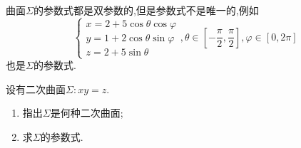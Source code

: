 \begin{remark}
    曲面$\Sigma$的参数式都是双参数的,但是参数式不是唯一的,例如
    $$
    \begin{cases}
        x = 2 + 5 \cos \theta \cos \varphi\\
        y = 1 + 2 \cos \theta \sin \varphi\\
        z = 2 + 5 \sin \theta
    \end{cases}, \theta \in [-\frac{\pi}{2},\frac{\pi}{2}],\varphi \in [0,2\pi]
    $$
    也是$\Sigma$的参数式.
\end{remark}

\begin{example}
    设有二次曲面$\Sigma:xy=z.$
    \begin{enumerate}
        \item 指出$\Sigma$是何种二次曲面;
        \item 求$\Sigma$的参数式.
    \end{enumerate}
\end{example}

